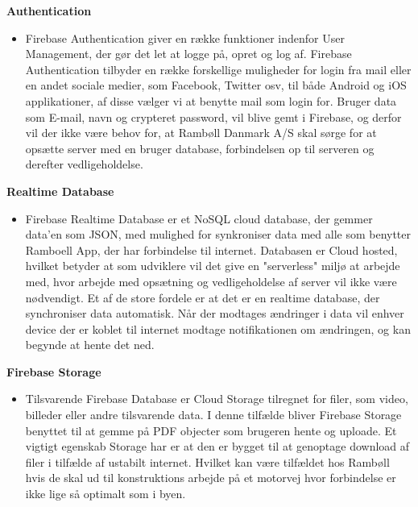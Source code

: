 \textbf{Authentication\cite{FirebaseAuth}}
\begin{itemize}[-]
	\itemsep 0.3em 
	\item[] Firebase Authentication giver en række funktioner indenfor User Management, der gør det let at logge på, opret og log af. Firebase Authentication tilbyder en række forskellige muligheder for login fra mail eller en andet sociale medier, som Facebook, Twitter osv, til både Android og iOS applikationer, af disse vælger vi at benytte mail som login for. Bruger data som E-mail, navn og crypteret password, vil blive gemt i Firebase, og derfor vil der ikke være behov for, at Rambøll Danmark A/S skal sørge for at opsætte server med en bruger database, forbindelsen op til serveren og derefter vedligeholdelse. 
	
\end{itemize}	
\textbf{Realtime Database\cite{FirebaseRealtimeDB}}
\begin{itemize}[-]
	\itemsep 0.3em 
	\item[]  Firebase Realtime Database er et NoSQL cloud database, der gemmer data'en som JSON\cite{JSON}, med mulighed for synkroniser data med alle som benytter Ramboell App, der har forbindelse til internet. Databasen er Cloud hosted, hvilket betyder at som udviklere vil det give en "serverless" miljø at arbejde med, hvor arbejde med opsætning og vedligeholdelse af server vil ikke være nødvendigt. Et af de store fordele er at det er en realtime database, der synchroniser data automatisk. Når der modtages ændringer i data vil enhver device der er koblet til internet modtage notifikationen om ændringen, og kan begynde at hente det ned. 
\end{itemize}
\textbf{Firebase Storage}
\begin{itemize}[-]
	\itemsep 0.3em 
	\item[] Tilsvarende Firebase Database er Cloud Storage tilregnet for filer, som video, billeder eller andre tilsvarende data. I denne tilfælde bliver Firebase Storage benyttet til at gemme på PDF objecter som brugeren hente og uploade. Et vigtigt egenskab Storage har er at den er bygget til at genoptage download af filer i tilfælde af ustabilt internet. Hvilket kan være tilfældet hos Rambøll hvis de skal ud til konstruktions arbejde på et motorvej hvor forbindelse er ikke lige så optimalt som i byen. 
\end{itemize}


\clearpage